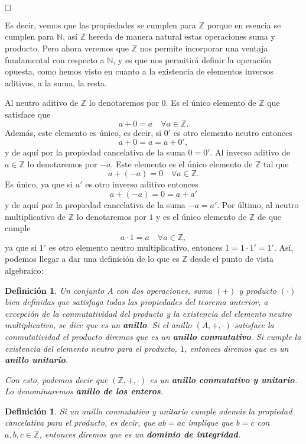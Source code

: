 \documentclass[12pt]{article}
\newtheorem{definition}[theorem]{Definición}
\begin{document}
$\hfill \square$

Es decir, vemos que las propiedades se cumplen para $\mathbb{Z}$ porque en esencia se cumplen para $\mathbb{N}$, así $\mathbb{Z}$ hereda de manera natural estas operaciones suma y producto. Pero ahora veremos que $\mathbb{Z}$ nos permite incorporar una ventaja fundamental con respecto a $\mathbb{N}$, y es que nos permitirá definir la operación opuesta, como hemos visto en cuanto a la existencia de elementos inversos aditivos, a la suma, la resta.

Al neutro aditivo de $\mathbb{Z}$ lo denotaremos por $0$. Es el único elemento de $\mathbb{Z}$ que satisface que $$a+0=a \quad \forall a \in \mathbb{Z}.$$ Además, este elemento es único, es decir, si $0'$ es otro elemento neutro entonces $$a+0 = a = a+0',$$ y de aquí por la propiedad cancelativa de la suma $0=0'$. Al inverso aditivo de $a \in \mathbb{Z}$ lo denotaremos por $-a$. Este elemento es el único elemento de $\mathbb{Z}$ tal que $$a +(-a)=0 \quad \forall a \in \mathbb{Z}.$$ Es único, ya que si $a'$ es otro inverso aditivo entonces $$a+(-a) = 0 = a+ a'$$ y de aquí por la propiedad cancelativa de la suma $-a=a'$. Por último, al neutro multiplicativo de $\mathbb{Z}$ lo denotaremos por $1$ y es el único elemento de $\mathbb{Z}$ de que cumple $$a \cdot 1 = a \quad \forall a \in \mathbb{Z},$$ ya que si $1'$ es otro elemento neutro multiplicativo, entonces $1 = 1 \cdot 1' = 1'$. Así, podemos llegar a dar una definición de lo que es $\mathbb{Z}$ desde el punto de vista algebraico:

\begin{definition}Un conjunto $A$ con dos operaciones, suma $(+)$ y producto $(\cdot)$ bien definidas que satisfaga todas las propiedades del teorema anterior, a excepción de la conmutatividad del producto y la existencia del elemento neutro multiplicativo, se dice que es un \textbf{anillo}. Si el anillo $(A, +, \cdot)$ satisface la conmutatividad el producto diremos que es un \textbf{anillo conmutativo}. Si cumple la existencia del elemento neutro para el producto, $1$, entonces diremos que es un \textbf{anillo unitario}.

Con esto, podemos decir que $(\mathbb{Z}, +, \cdot)$ es un \textbf{anillo conmutativo y unitario}. Lo denominaremos \textbf{anillo de los enteros}.
\end{definition}

\begin{definition}Si un anillo conmutativo y unitario cumple además la propiedad cancelativa para el producto, es decir, que $ab = ac$ implique que $b = c$ con $a,b,c \in \mathbb{Z}$, entonces diremos que es un \textbf{dominio de integridad}.
\end{definition}
\end{document}

